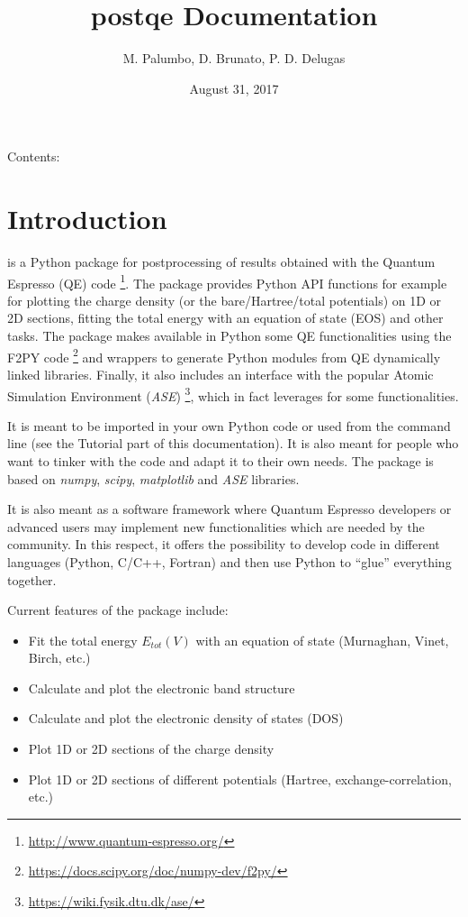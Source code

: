 \documentclass[letterpaper,10pt,english]{sphinxmanual}
\title{postqe Documentation}
\date{August 31, 2017}
\author{M. Palumbo, D. Brunato, P. D. Delugas}
\begin{document}
\maketitle
\tableofcontents
{}\label{index::doc}


Contents:


\chapter{Introduction}
\label{introduction:welcome-to-postqe-s-documentation}\label{introduction:introduction}\label{introduction::doc}\label{introduction:id1}
 is a Python package for postprocessing of results obtained with the Quantum Espresso (QE) code \footnote[1]{
\href{http://www.quantum-espresso.org/}{http://www.quantum-espresso.org/}
}. The package provides Python API functions for example for plotting the charge density (or the bare/Hartree/total potentials) on 1D or 2D sections, fitting the total energy with an equation of state (EOS) and other tasks. The package makes available in Python some QE functionalities using the F2PY code \footnote[2]{
\href{https://docs.scipy.org/doc/numpy-dev/f2py/}{https://docs.scipy.org/doc/numpy-dev/f2py/}
} and wrappers to generate Python modules from QE dynamically linked libraries. Finally, it also includes an interface with the popular Atomic Simulation Environment (\emph{ASE}) \footnote[3]{
\href{https://wiki.fysik.dtu.dk/ase/}{https://wiki.fysik.dtu.dk/ase/}
}, which in fact leverages for some functionalities.

It is meant to be imported in your own Python code or used from the command line (see the Tutorial part of this documentation). It is also meant for people who want to tinker with the code and adapt it to their own needs. The package is based on \emph{numpy}, \emph{scipy}, \emph{matplotlib} and \emph{ASE} libraries.

It is also meant as a software framework where Quantum Espresso developers or advanced users may implement new functionalities which are needed by the community. In this respect, it offers the possibility to develop code in different languages (Python, C/C++, Fortran) and then use Python to ``glue'' everything together.

Current features of the package include:
\begin{itemize}
\item {} 
Fit the total energy \(E_{tot}(V)\) with an equation of state (Murnaghan, Vinet, Birch, etc.)

\item {} 
Calculate and plot the electronic band structure

\item {} 
Calculate and plot the electronic density of states (DOS)

\item {} 
Plot 1D or 2D sections of the charge density

\item {} 
Plot 1D or 2D sections of different potentials (Hartree, exchange-correlation, etc.)

\end{itemize}
\end{document}
